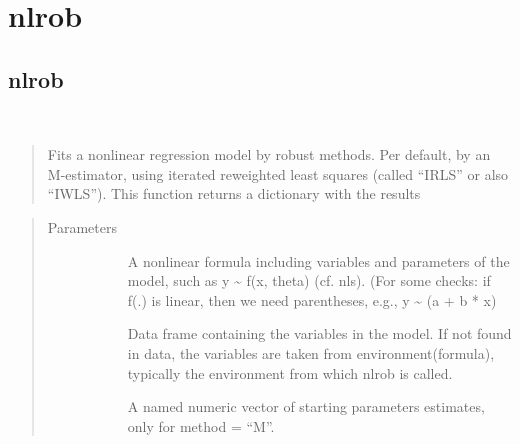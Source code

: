 \documentclass[letterpaper,10pt,english]{sphinxmanual}
\begin{document}
\section{nlrob}
\label{\detokenize{_modules/nlrob:nlrob}}\label{\detokenize{_modules/nlrob:id1}}\label{\detokenize{_modules/nlrob::doc}}\label{\detokenize{_modules/nlrob:module-nlrob}}

\subsection{nlrob}
\label{\detokenize{_modules/nlrob:id2}}

\begin{fulllineitems}
\label{\detokenize{_modules/nlrob:nlrob.nlrob}}~\begin{quote}

Fits a nonlinear regression model by robust methods. Per default, by an M-estimator, using iterated reweighted least squares (called “IRLS” or also “IWLS”).
This function returns a dictionary with the results
\end{quote}
\begin{quote}\begin{description}
\item[{Parameters}] \leavevmode\begin{description}
\item[{}] \leavevmode
A nonlinear formula including variables and parameters of the model,
such as y \textasciitilde{} f(x, theta) (cf. nls). (For some checks: if f(.) is 
linear, then we need parentheses, e.g., y \textasciitilde{} (a + b * x)

\item[{}] \leavevmode
Data frame containing the variables in the model. If not found in
data, the variables are taken from environment(formula), typically
the environment from which nlrob is called.

\item[{}] \leavevmode
A named numeric vector of starting parameters estimates, only for
method = “M”.


\end{description}
\end{description}
\end{quote}
\end{fulllineitems}
\end{document}
